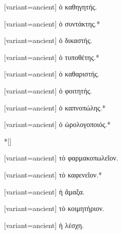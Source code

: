 \begin{greek}[variant=ancient]%
ὁ καθηγητής.%
\end{greek}%
\switchcolumn*
{}%
\switchcolumn
\begin{greek}[variant=ancient]%
ὁ συντάκτης.{*}%
\end{greek}%
\switchcolumn*
{}%
\switchcolumn
\begin{greek}[variant=ancient]%
ὁ δικαστής.%
\end{greek}%
\switchcolumn*
{}%
\switchcolumn
\begin{greek}[variant=ancient]%
ὁ τυποθέτης.{*}%
\end{greek}%
\switchcolumn*
{}%
\switchcolumn
\begin{greek}[variant=ancient]%
ὁ καθαριστής.%
\end{greek}%
\switchcolumn*
{}%
\switchcolumn
\begin{greek}[variant=ancient]%
ὁ φοιτητής.%
\end{greek}%
\switchcolumn*
{}%
\switchcolumn
\begin{greek}[variant=ancient]%
ὁ καπνοπώλης.{*}%
\end{greek}%
\switchcolumn*
{}%
\switchcolumn
\begin{greek}[variant=ancient]%
ὁ ὡρολογοποιός.{*}%
\end{greek}%
\switchcolumn*
\switchcolumn[0]*[\StarOrnament]%
\switchcolumn
\begin{greek}[variant=ancient]%
τὸ φαρμακοπωλεῖον.%
\end{greek}%
\switchcolumn*
{}%
\switchcolumn
\begin{greek}[variant=ancient]%
τὸ καφενεῖον.{*}%
\end{greek}%
\switchcolumn*
{}%
\switchcolumn
\begin{greek}[variant=ancient]%
ἡ ἅμαξα.%
\end{greek}%
\switchcolumn*
{}%
\switchcolumn
\begin{greek}[variant=ancient]%
τὸ κοιμητήριον.%
\end{greek}%
\switchcolumn*
{}%
\switchcolumn
\begin{greek}[variant=ancient]%
ἡ λέσχη.%
\end{greek}%
